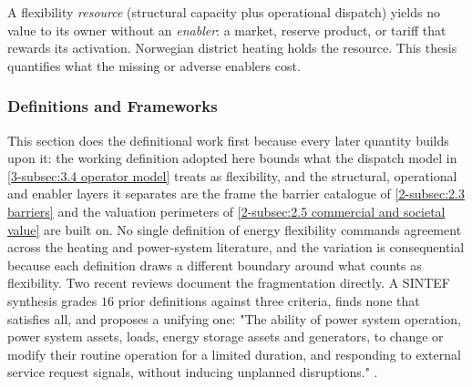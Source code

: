 \begin{keypoint}
A flexibility \textit{resource} (structural capacity plus operational dispatch) yields no value to its owner without an \textit{enabler}: a market, reserve product, or tariff that rewards its activation. Norwegian district heating holds the resource. This thesis quantifies what the missing or adverse enablers cost. 
\end{keypoint}


\subsubsection{Definitions and Frameworks}
\label{2-subsec:2.1.1 definitions}

This section does the definitional work first because every later quantity builds upon it: the working definition adopted here bounds what the dispatch model in \autoref{3-subsec:3.4 operator model} treats as flexibility, and the structural, operational and enabler layers it separates are the frame the barrier catalogue of \autoref{2-subsec:2.3 barriers} and the valuation perimeters of \autoref{2-subsec:2.5 commercial and societal value} are built on. No single definition of energy flexibility commands agreement across the heating and power-system literature, and the variation is consequential because each definition draws a different boundary around what counts as flexibility. Two recent reviews document the fragmentation directly. A SINTEF synthesis grades $16$ prior definitions against three criteria, finds none that satisfies all, and proposes a unifying one: "The ability of power system operation, power system assets, loads, energy storage assets and generators, to change or modify their routine operation for a limited duration, and responding to external service request signals, without inducing unplanned disruptions." \cite{degefa_comprehensive_2021}. 

